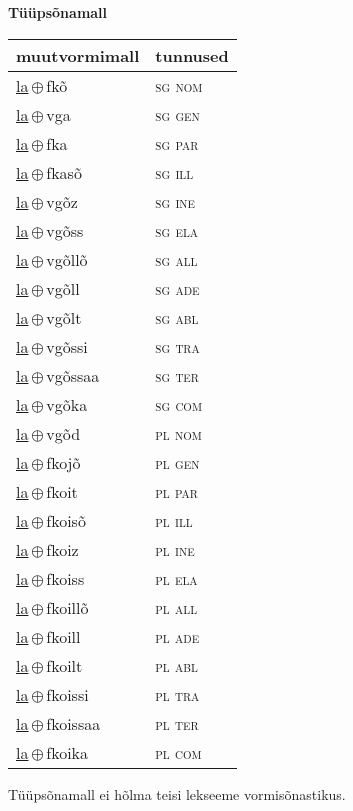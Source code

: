 

\vspace{3.5em}
\noindent \begin{minipage}{\textwidth}
\noindent \textbf{Tüüpsõnamall \,}\\

\begin{sideways}
\begin{tabular}{l l}
muutvormimall & tunnused \\
\hline
\underline{la}\,$\oplus$\,fkõ & \textsc{ sg nom } \\
\underline{la}\,$\oplus$\,vga & \textsc{ sg gen } \\
\underline{la}\,$\oplus$\,fka & \textsc{ sg par } \\
\underline{la}\,$\oplus$\,fkasõ & \textsc{ sg ill } \\
\underline{la}\,$\oplus$\,vgõz & \textsc{ sg ine } \\
\underline{la}\,$\oplus$\,vgõss & \textsc{ sg ela } \\
\underline{la}\,$\oplus$\,vgõllõ & \textsc{ sg all } \\
\underline{la}\,$\oplus$\,vgõll & \textsc{ sg ade } \\
\underline{la}\,$\oplus$\,vgõlt & \textsc{ sg abl } \\
\underline{la}\,$\oplus$\,vgõssi & \textsc{ sg tra } \\
\underline{la}\,$\oplus$\,vgõssaa & \textsc{ sg ter } \\
\underline{la}\,$\oplus$\,vgõka & \textsc{ sg com } \\
\underline{la}\,$\oplus$\,vgõd & \textsc{ pl nom } \\
\underline{la}\,$\oplus$\,fkojõ & \textsc{ pl gen } \\
\underline{la}\,$\oplus$\,fkoit & \textsc{ pl par } \\
\underline{la}\,$\oplus$\,fkoisõ & \textsc{ pl ill } \\
\underline{la}\,$\oplus$\,fkoiz & \textsc{ pl ine } \\
\underline{la}\,$\oplus$\,fkoiss & \textsc{ pl ela } \\
\underline{la}\,$\oplus$\,fkoillõ & \textsc{ pl all } \\
\underline{la}\,$\oplus$\,fkoill & \textsc{ pl ade } \\
\underline{la}\,$\oplus$\,fkoilt & \textsc{ pl abl } \\
\underline{la}\,$\oplus$\,fkoissi & \textsc{ pl tra } \\
\underline{la}\,$\oplus$\,fkoissaa & \textsc{ pl ter } \\
\underline{la}\,$\oplus$\,fkoika & \textsc{ pl com } \\
\end{tabular}
\end{sideways}
\label{tab:tüüpsõnamall-lafkõ}

\end{minipage}

 
\vspace{1em}
\noindent Tüüpsõnamall  ei hõlma teisi lekseeme vormi\-sõnastikus.
